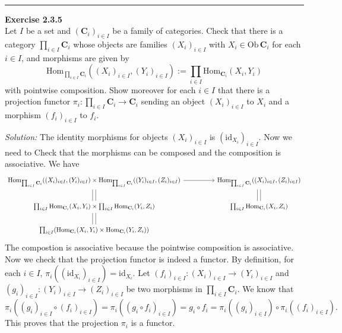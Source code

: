 \documentclass[a4paper, 12pt]{article}
\newenvironment{problem}[2][Exercise]
    { \begin{mdframed}[backgroundcolor=gray!20] \textbf{#1 #2} \\}
    {  \end{mdframed}}
\newenvironment{solution}
    {\textit{Solution:}}
    {}
\begin{document}
\\ 
\noindent\rule{7in}{2.8pt}
\begin{problem}{2.3.5}
Let \(I\) be a set and \((\mathbf{C}_i)_{i\in I}\) be a family of categories. Check that there is a category \(\prod_{i\in I}\mathbf{C}_i \) whose 
objects are families \((X_i)_{i\in I}\) with \(X_i\in \text{Ob}\, \mathbf{C}_i\) for each \(i\in I\), and morphisms are given by 
$$\text{Hom}_{\prod_{i\in I}\mathbf{C}_i}((X_i)_{i\in I}, (Y_i)_{i\in I}):=\prod_{i\in I}\text{Hom}_{\mathbf{C}_i}(X_i,Y_i)$$
with pointwise composition. Show moreover for each \(i\in I\) that there is a projection functor \(\pi_i:\prod_{i\in I}\mathbf{C}_i\rightarrow \mathbf{C}_i\) 
sending an object \((X_i)_{i \in I}\) to \(X_i\) and a morphism \((f_i)_{i\in I}\) to \(f_i\).
\end{problem}
\begin{solution}
The identity morphisms for objects \((X_i)_{i\in I}\) is \((\text{id}_{X_i})_{i\in I}\). Now we need to Check that the morphisms can be composed and the composition is 
associative. We have 
$$\begin{tikzcd}
	{\text{Hom}_{\prod_{i\in I}\mathbf{C}_i}((X_i)_{i\in I},(Y_i)_{i\in I})\times\text{Hom}_{\prod_{i\in I}\mathbf{C}_i}((Y_i)_{i\in I},(Z_i)_{i\in I})} && {\text{Hom}_{\prod_{i\in I}\mathbf{C}_i}((X_i)_{i\in I},(Z_i)_{i\in I})} \\
	{\prod_{i\in I}\text{Hom}_{\mathbf{C}_i}(X_i,Y_i)\times\prod_{i\in I}\text{Hom}_{\mathbf{C}_i}(Y_i,Z_i)} && {\prod_{i\in I}\text{Hom}_{\mathbf{C}_i}(X_i,Z_i)} \\
	{\prod_{i\in I}(\text{Hom}_{\mathbf{C}_i}(X_i,Y_i)\times\text{Hom}_{\mathbf{C}_i}(Y_i,Z_i))}
	\arrow[from=1-1, to=1-3]
	\arrow[shift right, no head, from=1-1, to=2-1]
	\arrow[shift left, no head, from=1-1, to=2-1]
	\arrow[shift left, no head, from=1-3, to=2-3]
	\arrow[shift right, no head, from=1-3, to=2-3]
	\arrow[shift left, no head, from=2-1, to=3-1]
	\arrow[shift right, no head, from=2-1, to=3-1]
\end{tikzcd}$$
The compostion is associative because the pointwise composition is associative. Now we check that the projection functor is indeed a functor. By definition, for each \(i\in I\), 
\(\pi_i((\text{id}_{X_i})_{i\in I})=\text{id}_{X_i}\). Let \((f_i)_{i\in I}:(X_i)_{i\in I}\rightarrow (Y_i)_{i\in I}\) and \((g_i)_{i\in I}:(Y_i)_{i\in I}\rightarrow (Z_i)_{i\in I}\) be two morphisms in 
\(\prod_{i\in I}\mathbf{C}_i\). We know that 
$$\pi_i((g_i)_{i\in I}\circ (f_i)_{i\in I})=\pi_i((g_i\circ f_i)_{i\in I})=g_i\circ f_i=\pi_i((g_i)_{i\in I})\circ \pi_i((f_i)_{i\in I}).$$
This proves that the projection \(\pi_i\) is a functor.
\end{solution}
\end{document}
